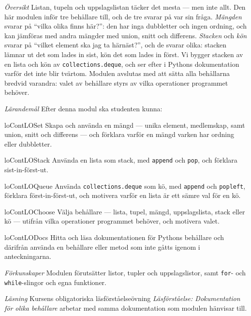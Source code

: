 \emph{Översikt}
Listan, tupeln och uppslagslistan täcker det mesta --- men inte allt.
Den här modulen inför tre behållare till, och de tre svarar på var sin
fråga.  \emph{Mängden} svarar på \enquote{vilka olika finns här?}: den
har inga dubbletter och ingen ordning, och kan jämföras med andra
mängder med union, snitt och differens.  \emph{Stacken} och \emph{kön}
svarar på \enquote{vilket element ska jag ta härnäst?}, och de svarar
olika: stacken lämnar ut det som lades in sist, kön det som lades in
först.  Vi bygger stacken av en lista och kön av
\texttt{collections.deque}, och ser efter i Pythons
dokumentation varför det inte blir tvärtom.  Modulen avslutas med att
sätta alla behållarna bredvid varandra: valet av behållare styrs av
vilka operationer programmet behöver.

\emph{Lärandemål}
Efter denna modul ska studenten kunna:
\begin{restatable}{lo}{ContLOSet}\label{ContLOSet}%
  Skapa och använda en mängd --- unika element, medlemskap, samt union,
  snitt och differens --- och förklara varför en mängd varken har
  ordning eller dubbletter.
\end{restatable}%
\begin{restatable}{lo}{ContLOStack}\label{ContLOStack}%
  Använda en lista som stack, med \texttt{append} och
  \texttt{pop}, och förklara sist-in-först-ut.
\end{restatable}%
\begin{restatable}{lo}{ContLOQueue}\label{ContLOQueue}%
  Använda \texttt{collections.deque} som kö, med
  \texttt{append} och \texttt{popleft}, förklara
  först-in-först-ut, och motivera varför en lista är ett sämre val för
  en kö.
\end{restatable}%
\begin{restatable}{lo}{ContLOChoose}\label{ContLOChoose}%
  Välja behållare --- lista, tupel, mängd, uppslagslista, stack eller
  kö --- utifrån vilka operationer programmet behöver, och motivera
  valet.
\end{restatable}%
\begin{restatable}{lo}{ContLODocs}\label{ContLODocs}%
  Hitta och läsa dokumentationen för Pythons behållare och därifrån
  använda en behållare eller metod som inte gåtts igenom i
  anteckningarna.
\end{restatable}%

\emph{Förkunskaper}
Modulen förutsätter listor, tupler och uppslagslistor, samt
\texttt{for}- och \texttt{while}-slingor och
egna funktioner.

\emph{Läsning}
Kursens obligatoriska läsförståelseövning \emph{Läsförståelse:
Dokumentation för olika behållare} arbetar med samma dokumentation som
modulen hänvisar till.
